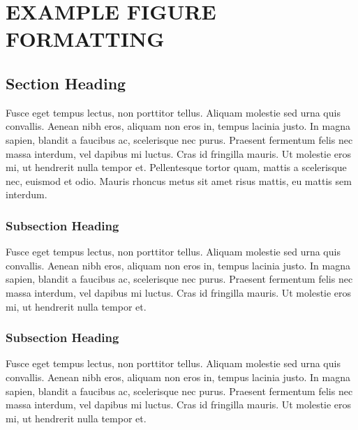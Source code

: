 \chapter{EXAMPLE FIGURE FORMATTING} \label{materials}

\renewcommand*{\thealgorithm}{\thechapter-\arabic{algorithm}} %


\section{Section Heading}

 Fusce eget tempus lectus, non porttitor tellus. Aliquam molestie sed urna quis convallis. Aenean nibh eros, aliquam non eros in, tempus lacinia justo. \cite{2008arXiv0807.1715B} In magna sapien, blandit a faucibus ac, scelerisque nec purus. Praesent fermentum felis nec massa interdum, vel dapibus mi luctus. Cras id fringilla mauris. Ut molestie eros mi, ut hendrerit nulla tempor et. Pellentesque tortor quam, mattis a scelerisque nec, euismod et odio. Mauris rhoncus metus sit amet risus mattis, eu mattis sem interdum.

\subsection{Subsection Heading}
Fusce eget tempus lectus, non porttitor tellus. Aliquam molestie sed urna quis convallis. Aenean nibh eros, aliquam non eros in, tempus lacinia justo. In magna sapien, blandit a faucibus ac, scelerisque nec purus. Praesent fermentum felis nec massa interdum, vel dapibus mi luctus. Cras id fringilla mauris. Ut molestie eros mi, ut hendrerit nulla tempor et.\cite{Rudin-UnitBallCN}

\subsection{Subsection Heading}
Fusce eget tempus lectus, non porttitor tellus. Aliquam molestie sed urna quis convallis. Aenean nibh eros, aliquam non eros in, tempus lacinia justo. In magna sapien, blandit a faucibus ac, scelerisque nec purus. Praesent fermentum felis nec massa interdum, vel dapibus mi luctus. Cras id fringilla mauris. Ut molestie eros mi, ut hendrerit nulla tempor et. \cite{Rudin-UnitBallCN}


